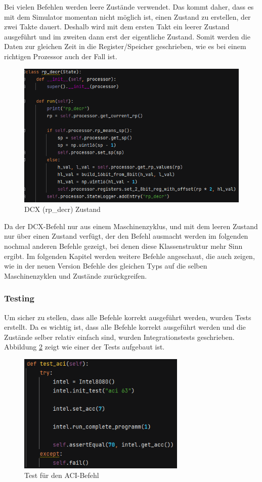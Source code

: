 \documentclass[12pt]{article}
\newcommand{\imgSpaceBefore}{\vspace{10pt}}
\begin{document}
\noindent
Bei vielen Befehlen werden leere Zustände verwendet. Das kommt daher, dass es mit dem Simulator momentan nicht möglich ist, einen Zustand zu erstellen, der zwei Takte dauert. Deshalb wird mit dem ersten Takt ein leerer Zustand ausgeführt und im zweiten dann erst der eigentliche Zustand. Somit werden die Daten zur gleichen Zeit in die Register/Speicher geschrieben, wie es bei einem richtigen Prozessor auch der Fall ist.

\imgSpaceBefore
\begin{figure}[H]
\centering
\includegraphics[width=14cm]{bilder/dcx_state}
\caption{DCX (rp\_decr) Zustand}
\label{fig:Dcx_state}
\end{figure}

\noindent
Da der DCX-Befehl nur aus einem Maschinenzyklus, und mit dem leeren Zustand nur über einen Zustand verfügt, der den Befehl ausmacht werden im folgenden nochmal anderen Befehle gezeigt, bei denen diese Klassenstruktur mehr Sinn ergibt. Im folgenden Kapitel werden weitere Befehle angeschaut, die auch zeigen, wie in der neuen Version Befehle des gleichen Typs auf die selben Maschinenzyklen und Zustände zurückgreifen.

\subsubsection{Testing}
Um sicher zu stellen, dass alle Befehle korrekt ausgeführt werden, wurden Tests erstellt. 
Da es wichtig ist, dass alle Befehle korrekt ausgeführt werden und die Zustände selber relativ einfach sind, wurden Integrationstests geschrieben. Abbildung \ref{fig:test_aci} zeigt wie einer der Tests aufgebaut ist. 

\imgSpaceBefore
\begin{figure}[H]
\centering
\includegraphics[width=8cm]{bilder/test_aci}
\caption{Test für den ACI-Befehl}
\label{fig:test_aci}
\end{figure}
\end{document}
